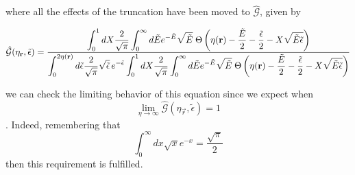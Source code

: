 where all the effects of the truncation have been moved to $\hat{\mathcal{G}}$, given by 

\begin{equation*}
	\hat{\mathcal{G}}(\eta_{\mathbf{r}}, \tilde{\epsilon}) = \frac{\displaystyle
	\int_0^1 dX \frac{2}{\sqrt{\pi}} \int_0^\infty d \tilde{E} e^{-\tilde{E}}\sqrt{\tilde{E}} \; \Theta \left( {\eta(\mathbf{r}) - \frac{\tilde{E}}{2} - \frac{\tilde{\epsilon}}{2} - X \sqrt{\tilde{E}\tilde{\epsilon}}} \right)}
	{\displaystyle \int_0^{2\eta(\mathbf{r})} d \tilde{\epsilon} \frac{2}{\sqrt{\pi}} \sqrt{\tilde{\epsilon}} \, e^{-\tilde{\epsilon}} \int_0^1 dX \frac{2}{\sqrt{\pi}} \int_0^\infty d \tilde{E} e^{-\tilde{E}}\sqrt{\tilde{E}} \; \Theta \left( {\eta(\mathbf{r}) - \frac{\tilde{E}}{2} - \frac{\tilde{\epsilon}}{2} - X \sqrt{\tilde{E}\tilde{\epsilon}}} \right)}
\end{equation*}

we can check the limiting behavior of this equation since we expect when $$\lim_{\eta \rightarrow \infty} \hat{\mathcal{G}}(\eta_{\vec{r}}, \tilde{\epsilon}) = 1$$. Indeed, remembering that $$ \int_0^{\infty} dx \sqrt{x} e^{-x} = \frac{\sqrt{\pi}}{2}$$ then this requirement is fulfilled. 